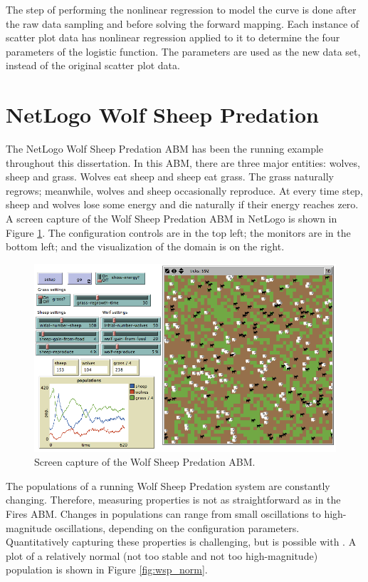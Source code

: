 The step of performing the nonlinear regression to model the curve is done after the raw data sampling and before solving the forward mapping.
Each instance of scatter plot data has nonlinear regression applied to it to determine the four parameters of the logistic function.
The parameters are used as the new data set, instead of the original scatter plot data.




 \section{NetLogo Wolf Sheep Predation}
The NetLogo Wolf Sheep Predation ABM has been the running example throughout this dissertation.
In this ABM, there are three major entities: wolves, sheep and grass.
Wolves eat sheep and sheep eat grass.
The grass naturally regrows; meanwhile, wolves and sheep occasionally reproduce.
At every time step, sheep and wolves lose some energy and die naturally if their energy reaches zero.
A screen capture of the Wolf Sheep Predation ABM in NetLogo is shown in Figure \ref{fig:wolfsheepss}.
The configuration controls are in the top left; the monitors are in the bottom left; and the visualization of the domain is on the right.

\begin{figure}[ht]
\centering
\includegraphics[scale=.4]{images/wolfsheep_ss.png}
\caption{Screen capture of the Wolf Sheep Predation ABM.}
\label{fig:wolfsheepss}
\end{figure}

The populations of a running Wolf Sheep Predation system are constantly changing.
Therefore, measuring properties is not as straightforward as in the Fires ABM.
Changes in populations can range from small oscillations to high-magnitude oscillations, depending on the configuration parameters.
Quantitatively capturing these properties is challenging, but is possible with \fw.
A plot of a relatively normal (not too stable and not too high-magnitude) population is shown in Figure \ref{fig:wsp_norm}.

